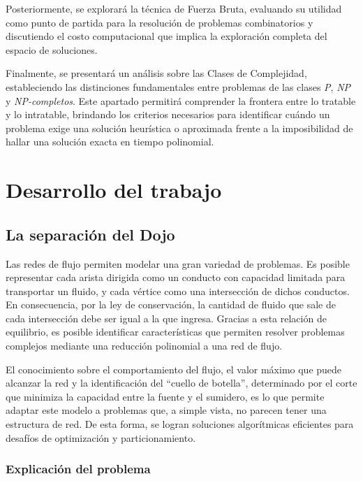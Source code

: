\documentclass[12pt]{article}
\begin{document}
    Posteriormente, se explorará la técnica de Fuerza Bruta, evaluando su utilidad como punto de partida para la resolución de problemas combinatorios y discutiendo el costo computacional que implica la exploración completa del espacio de soluciones. 
    
    Finalmente, se presentará un análisis sobre las Clases de Complejidad, estableciendo las distinciones fundamentales entre problemas de las clases \textit{P}, \textit{NP} y \textit{NP-completos}. Este apartado permitirá comprender la frontera entre lo tratable y lo intratable, brindando los criterios necesarios para identificar cuándo un problema exige una solución heurística o aproximada frente a la imposibilidad de hallar una solución exacta en tiempo polinomial.

\section{Desarrollo del trabajo}

    \subsection{La separación del Dojo}

        Las redes de flujo permiten modelar una gran variedad de problemas. Es posible representar cada arista dirigida como un conducto con capacidad limitada para transportar un fluido, y cada vértice como una intersección de dichos conductos. En consecuencia, por la ley de conservación, la cantidad de fluido que sale de cada intersección debe ser igual a la que ingresa. Gracias a esta relación de equilibrio, es posible identificar características que permiten resolver problemas complejos mediante una reducción polinomial a una red de flujo.

        El conocimiento sobre el comportamiento del flujo, el valor máximo que puede alcanzar la red y la identificación del ``cuello de botella'', determinado por el corte que minimiza la capacidad entre la fuente y el sumidero, es lo que permite adaptar este modelo a problemas que, a simple vista, no parecen tener una estructura de red. De esta forma, se logran soluciones algorítmicas eficientes para desafíos de optimización y particionamiento.

        \subsubsection{Explicación del problema}
\end{document}
